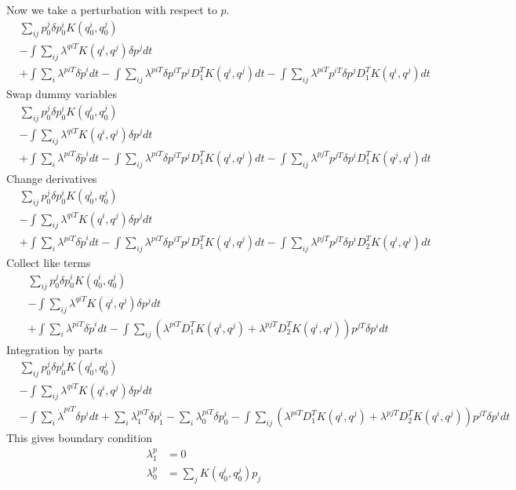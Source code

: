 \documentclass{article}
\begin{document}
Now we take a perturbation with respect to $p$.
\begin{align*}
&\sum_{ij}p_0^j\delta p_0^i K(q_0^i,q_0^j) \\
& - \int \sum_{ij} \lambda^{qiT}K(q^i,q^j)\delta p^j dt \\
& + \int \sum_i \lambda^{piT}\delta \dot p^idt - \int \sum_{ij}\lambda^{piT}\delta p^{iT}p^jD_1^TK(q^i,q^j)dt
- \int \sum_{ij}\lambda^{piT} p^{iT}\delta p^jD_1^TK(q^i,q^j)dt
\end{align*}
Swap dummy variables
\begin{align*}
&\sum_{ij}p_0^j\delta p_0^i K(q_0^i,q_0^j) \\
& - \int \sum_{ij} \lambda^{qiT}K(q^i,q^j)\delta p^j dt \\
& + \int \sum_i \lambda^{piT}\delta \dot p^idt - \int \sum_{ij}\lambda^{piT}\delta p^{iT}p^jD_1^TK(q^i,q^j)dt
- \int \sum_{ij}\lambda^{pjT} p^{jT}\delta p^iD_1^TK(q^j,q^i)dt
\end{align*}
Change derivatives
\begin{align*}
&\sum_{ij}p_0^j\delta p_0^i K(q_0^i,q_0^j) \\
& - \int \sum_{ij} \lambda^{qiT}K(q^i,q^j)\delta p^j dt \\
& + \int \sum_i \lambda^{piT}\delta \dot p^idt - \int \sum_{ij}\lambda^{piT}\delta p^{iT}p^jD_1^TK(q^i,q^j)dt
- \int \sum_{ij}\lambda^{pjT} p^{jT}\delta p^iD_2^TK(q^i,q^j)dt
\end{align*}
Collect like terms
\begin{align*}
&\sum_{ij}p_0^j\delta p_0^i K(q_0^i,q_0^j) \\
& - \int \sum_{ij} \lambda^{qiT}K(q^i,q^j)\delta p^j dt \\
& + \int \sum_i \lambda^{piT}\delta \dot p^idt - \int \sum_{ij}(\lambda^{piT}D_1^TK(q^i,q^j) + \lambda^{pjT}D_2^TK(q^i,q^j))p^{jT}\delta p^{i}dt
\end{align*}
Integration by parts
\begin{align*}
&\sum_{ij}p_0^j\delta p_0^i K(q_0^i,q_0^j) \\
& - \int \sum_{ij} \lambda^{qiT}K(q^i,q^j)\delta p^j dt \\
& - \int \sum_i \dot \lambda^{piT}\delta p^idt + \sum_{i}  \lambda^{piT}_1 \delta p^i_1 - \sum_{i} \lambda^{piT}_0 \delta p^i_0 - \int \sum_{ij}(\lambda^{piT}D_1^TK(q^i,q^j) + \lambda^{pjT}D_2^TK(q^i,q^j))p^{jT}\delta p^{i}dt
\end{align*}
This gives boundary condition
\begin{align*}
\lambda^{p}_1 &= 0\\
\lambda^p_0 &= \sum_j K(q_0^i,q_0^j)p_j
\end{align*}
\end{document}
